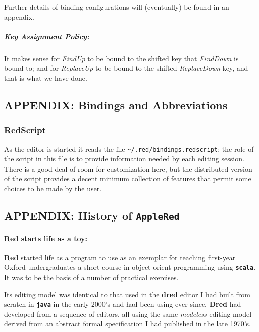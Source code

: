 \documentclass[12pt,a4paper]{article}
\begin{document}
Further details of binding configurations will (eventually) be found in
an appendix.

\hypertarget{key-assignment-policy}{%
\subparagraph{Key Assignment Policy:}\label{key-assignment-policy}}

It makes sense for \emph{FindUp} to be bound to the shifted key that
\emph{FindDown} is bound to; and for \emph{ReplaceUp} to be bound to the
shifted \emph{ReplaceDown} key, and that is what we have done.

\hypertarget{appendix-bindings-and-abbreviations}{%
\subsection{APPENDIX: Bindings and
Abbreviations}\label{appendix-bindings-and-abbreviations}}

\hypertarget{redscript}{%
\subsubsection{RedScript}\label{redscript}}

As the editor is started it reads the file
\texttt{\textasciitilde{}/.red/bindings.redscript}: the role of the
script in this file is to provide information needed by each editing
session. There is a good deal of room for customization here, but the
distributed version of the script provides a decent minimum collection
of features that permit some choices to be made by the user.

\hypertarget{appendix-history-of-applered}{%
\subsection{\texorpdfstring{APPENDIX: History of
\texttt{AppleRed}}{APPENDIX: History of AppleRed}}\label{appendix-history-of-applered}}

\hypertarget{red-starts-life-as-a-toy}{%
\paragraph{Red starts life as a toy:}\label{red-starts-life-as-a-toy}}

\textbf{Red} started life as a program to use as an exemplar for
teaching first-year Oxford undergraduates a short course in
object-orient programming using \textbf{\texttt{scala}}. It was to be
the basis of a number of practical exercises.

Its editing model was identical to that used in the \textbf{dred} editor
I had built from scratch in \textbf{\texttt{java}} in the early 2000's
and had been using ever since. \textbf{Dred} had developed from a
sequence of editors, all using the same \emph{modeless} editing model
derived from an abstract formal specification I had published in the
late 1970's.
\end{document}
